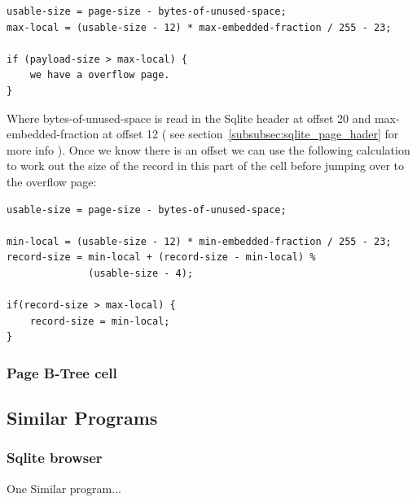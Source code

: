 \begin{lstlisting}	
usable-size = page-size - bytes-of-unused-space;
max-local = (usable-size - 12) * max-embedded-fraction / 255 - 23;

if (payload-size > max-local) {
	we have a overflow page.
}
\end{lstlisting}

Where bytes-of-unused-space is read in the Sqlite header at offset 20 and \newline max-embedded-fraction at offset 12 ( see section~\ref{subsubsec:sqlite_page_hader} for more info ). Once we know there is an offset we can use the following calculation to work out the size of the record in this part of the cell before jumping over to the overflow page:  

\begin{lstlisting}	
usable-size = page-size - bytes-of-unused-space;

min-local = (usable-size - 12) * min-embedded-fraction / 255 - 23;
record-size = min-local + (record-size - min-local) % 
			  (usable-size - 4);

if(record-size > max-local) {
	record-size = min-local;
}
\end{lstlisting}

\subsubsection{Page B-Tree cell}
\label{subsubsec:page_btree_cell}



\subsection{Similar Programs}
\label{subsec:similar_programs}

\subsubsection{Sqlite browser}
\label{subsubsec:sqlite_browser}

One Similar program...
